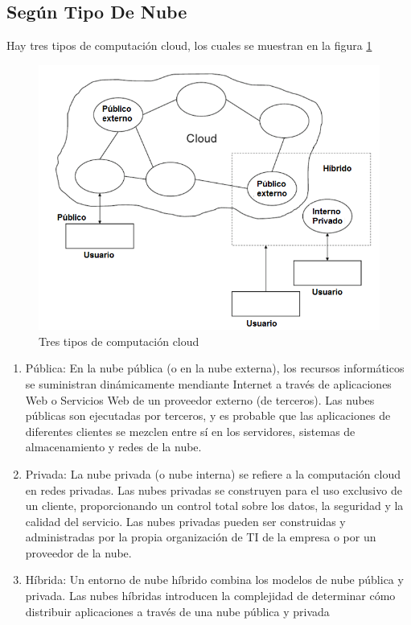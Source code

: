 \documentclass[a4paper, 12pt]{report}
\begin{document}
\subsection{Seg\'un Tipo De Nube}
\begin{justify}
Hay tres tipos de computación cloud, los cuales se muestran en la figura \ref{fig:cloudtipos}
\begin{figure}[ht]
	\begin{center}
		\includegraphics[width=.8\textwidth]{cloudtipos}
		\caption{Tres tipos de computaci\'on cloud \cite{handbook}}
		\label{fig:cloudtipos}
	\end{center}
\end{figure}
\begin{enumerate}[label=\alph*)]
    \item{P\'ublica:} En la nube pública (o en la nube externa), los recursos inform\'aticos se suministran din\'amicamente mendiante Internet a trav\'es de aplicaciones Web o Servicios Web de un proveedor externo (de terceros). Las nubes p\'ublicas son ejecutadas por terceros, y es probable que las aplicaciones de diferentes clientes se mezclen entre sí en los servidores, sistemas de almacenamiento y redes de la nube.
    \item{Privada:} La nube privada (o nube interna) se refiere a la computaci\'on cloud en redes privadas. Las nubes privadas se construyen para el uso exclusivo de un cliente, proporcionando un control total sobre los datos, la seguridad y la calidad del servicio. Las nubes privadas pueden ser construidas y administradas por la propia organización de TI de la empresa o por un proveedor de la nube.
    \item{H\'ibrida:} Un entorno de nube híbrido combina los modelos de nube pública y privada. Las nubes híbridas introducen la complejidad de determinar cómo distribuir aplicaciones a través de una nube pública y privada

\end{enumerate}
\end{justify}
\end{document}
